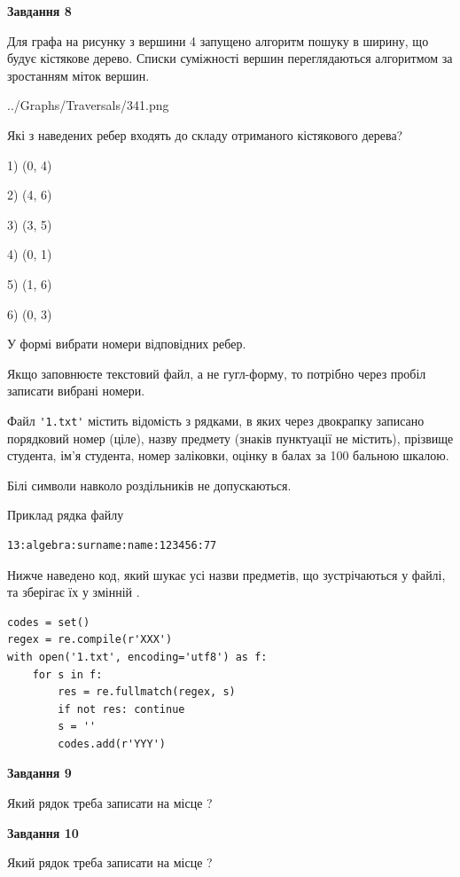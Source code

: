 \documentclass[12pt, ukrainian]{article}
\def\code#1{\Verb!#1!}
\begin{document}
{\begin {large}
{\begin {center}\textbf{Завдання 8}\end {center}}\par
Для графа на рисунку з вершини 4 запущено алгоритм пошуку в ширину, що будує кістякове дерево. Списки суміжності вершин переглядаються алгоритмом за зростанням міток вершин.\par
\begin{center}
	{../Graphs/Traversals/341.png}
\end{center}
\par Які з наведених ребер входять до складу отриманого кістякового дерева?\par
1) (0, 4)\par
2) (4, 6)\par
3) (3, 5)\par
4) (0, 1)\par
5) (1, 6)\par
6) (0, 3)\par
{\vskip 15pt} У формі вибрати номери відповідних ребер.


Якщо заповнюєте текстовий файл, а не гугл-форму, то потрібно через пробіл записа\-ти вибрані номери.\par
\newpage


Файл \code{'1.txt'} містить відомість з рядками, в яких через двокрапку записано поряд\-ковий номер (ціле), назву предмету (знаків пунктуації не містить), прізвище студента, ім'я студента, номер заліковки, оцінку в балах за 100 бальною шкалою.

Білі символи навколо роздільників не допускаються.

Приклад рядка файлу



\begin{verbatim}
13:algebra:surname:name:123456:77
\end{verbatim}


Нижче наведено код, який шукає усі назви предметів, що зустрічаються у файлі, та зберігає їх у змінній .



\begin{verbatim}
codes = set()
regex = re.compile(r'XXX')
with open('1.txt', encoding='utf8') as f:
    for s in f:
        res = re.fullmatch(regex, s)
        if not res: continue
        s = ''
        codes.add(r'YYY')
\end{verbatim}


{\begin {center}\textbf{Завдання 9}\end {center}}\par
Який рядок треба записати на місце  ?\par
\vspace{5mm}


{\begin {center}\textbf{Завдання 10}\end {center}}\par
Який рядок треба записати на місце  ?\par


\newpage


\end {large}}
\end{document}
